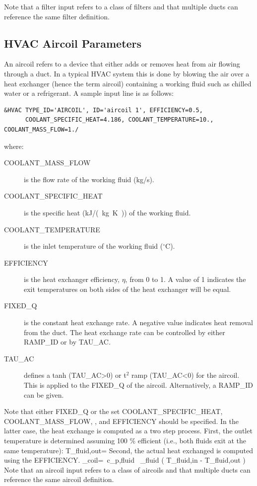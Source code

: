 \documentclass[11pt]{book}
\begin{document}
Note that a filter input refers to a class of filters and that multiple ducts can reference the same filter definition.

\subsection{HVAC Aircoil Parameters}
\label{info:HVACaircoil}
\label{HVAC_aircoil}

An aircoil refers to a device that either adds or removes heat from air flowing through a duct.  In a typical HVAC system this is done by blowing the air over a heat exchanger (hence the term aircoil) containing a working fluid such as chilled water or a refrigerant.  A sample input line is as follows:
\begin{lstlisting}
&HVAC TYPE_ID='AIRCOIL', ID='aircoil 1', EFFICIENCY=0.5,
      COOLANT_SPECIFIC_HEAT=4.186, COOLANT_TEMPERATURE=10., COOLANT_MASS_FLOW=1./
\end{lstlisting}
where:
\begin{description}
\item[{\ct COOLANT\_MASS\_FLOW}] is the flow rate of the working fluid (kg/s).
\item[{\ct COOLANT\_SPECIFIC\_HEAT}] is the specific heat (\si{kJ/(kg.K)}) of the working fluid.
\item[{\ct COOLANT\_TEMPERATURE}] is the inlet temperature of the working fluid ($^\circ$C).
\item[{\ct EFFICIENCY}] is the heat exchanger efficiency, $\eta$, from 0 to 1.  A value of 1 indicates the exit temperatures on both sides of the heat exchanger will be equal.
\item[{\ct FIXED\_Q}] is the constant heat exchange rate. A negative value indicates heat removal from the duct.  The heat exchange rate can be controlled by either {\ct RAMP\_ID} or by {\ct TAU\_AC}.
\item[{\ct TAU\_AC}]  defines a tanh ({\ct TAU\_AC}>0) or t$^2$ ramp ({\ct TAU\_AC}<0) for the aircoil.  This is applied to the {\ct FIXED\_Q} of the aircoil. Alternatively, a {\ct RAMP\_ID} can be given.
\end{description}
Note that either {\ct FIXED\_Q} or the set {\ct COOLANT\_SPECIFIC\_HEAT}, {\ct COOLANT\_MASS\_FLOW}, , and {\ct EFFICIENCY} should be specified.  In the latter case, the heat exchange is computed as a two step process.  First, the outlet temperature is determined assuming 100 \% efficient (i.e., both fluids exit at the same temperature):
\be
  T_{\rm fluid,out}=
\ee
Second, the actual heat exchanged is computed using the {\ct EFFICIENCY}.
\be
  \dq_{\rm coil}=\eta \, c_{p,{\rm fluid}} \, \dm_{\rm fluid} \left( T_{\rm fluid,in} - T_{\rm fluid,out} \right)
\ee
Note that an aircoil input refers to a class of aircoils and that multiple ducts can reference the same aircoil definition.
\end{document}
